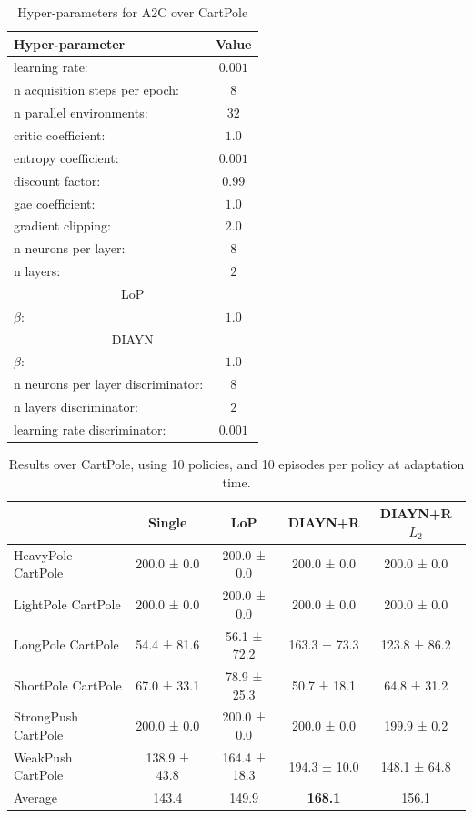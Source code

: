 \begin{table}[h!]
\begin{center}
\begin{tabular}{l|c} \toprule
   \textbf{Hyper-parameter} & \textbf{Value} \\ \hline
    learning rate: &  $0.001$\\
    n acquisition steps per epoch: & $8$ \\
    n parallel environments: &  $32$\\
    critic coefficient: &  $1.0$\\
    entropy coefficient: &  $0.001$\\
    discount factor: &  $0.99$\\
    gae coefficient: &  $1.0$\\
    gradient clipping: & $2.0$ \\ 
    n neurons per layer: & $8$ \\
    n layers: & $2$ \\
 \toprule
    \multicolumn{2}{c}{LoP} \\ 
    \hline
    $\beta$: & $1.0$ \\
    \toprule
    \multicolumn{2}{c}{DIAYN} \\ 
    \hline
    $\beta$: & $1.0$ \\
    n neurons per layer discriminator: & $8$ \\
    n layers discriminator: & $2$ \\
    learning rate discriminator: & $0.001$ \\ \hline
\end{tabular}
\end{center}
\caption{Hyper-parameters for A2C over CartPole}
\label{table:hp_cartpole}
\end{table}

\begin{table}[h!]
\begin{center}
    \begin{tabular}{l|c|c|c|c} \toprule
    &	Single	& LoP &	DIAYN+R& 	DIAYN+R $L_2$	\\ \hline
HeavyPole CartPole	&	200.0 ± 0.0	& 200.0 ± 0.0	& 200.0 ± 0.0	& 200.0 ± 0.0	\\ 
LightPole CartPole	&	200.0 ± 0.0	& 200.0 ± 0.0	& 200.0 ± 0.0	& 200.0 ± 0.0	\\ 
LongPole CartPole	&	54.4 ± 81.6	& 56.1 ± 72.2	& 163.3 ± 73.3	& 123.8 ± 86.2	\\ 
ShortPole CartPole	&	67.0 ± 33.1	& 78.9 ± 25.3	& 50.7 ± 18.1	& 64.8 ± 31.2	\\ 
StrongPush CartPole	&	200.0 ± 0.0	& 200.0 ± 0.0	& 200.0 ± 0.0	& 199.9 ± 0.2	\\ 
WeakPush CartPole	&	138.9 ± 43.8	& 164.4 ± 18.3	& 194.3 ± 10.0	& 148.1 ± 64.8	\\ \hline
Average	&	143.4	&149.9&	\textbf{168.1} &	156.1\\
\hline
\end{tabular}
\caption{Results over CartPole, using 10 policies, and 10 episodes per policy at adaptation time. }
\end{center}
\end{table}
\newpage

